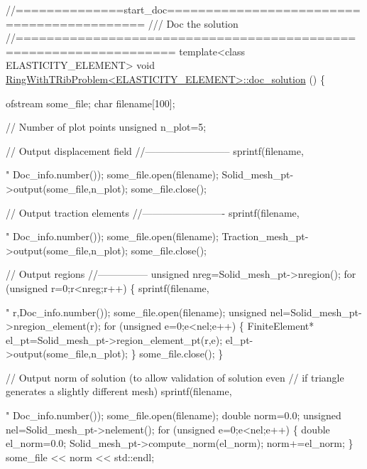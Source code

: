 \begin{DoxyCodeInclude}
\textcolor{comment}{//==============start\_doc===========================================}\textcolor{comment}{}
\textcolor{comment}{/// Doc the solution}
\textcolor{comment}{}\textcolor{comment}{//==================================================================}
\textcolor{keyword}{template}<\textcolor{keyword}{class} ELASTICITY\_ELEMENT>
\textcolor{keywordtype}{void} \hyperlink{classRingWithTRibProblem_a43b70b125f467aa5bb9c74d08f193aa5}{RingWithTRibProblem<ELASTICITY\_ELEMENT>::doc\_solution}
      ()
\{

 ofstream some\_file;
 \textcolor{keywordtype}{char} filename[100];

 \textcolor{comment}{// Number of plot points}
 \textcolor{keywordtype}{unsigned} n\_plot=5; 

 \textcolor{comment}{// Output displacement field}
 \textcolor{comment}{//--------------------------}
 sprintf(filename,\textcolor{stringliteral}{"%
         Doc\_info.number());
 some\_file.open(filename);
 Solid\_mesh\_pt->output(some\_file,n\_plot);
 some\_file.close();

 \textcolor{comment}{// Output traction elements}
 \textcolor{comment}{//-------------------------}
 sprintf(filename,\textcolor{stringliteral}{"%
         Doc\_info.number());
 some\_file.open(filename);
 Traction\_mesh\_pt->output(some\_file,n\_plot);
 some\_file.close();

 \textcolor{comment}{// Output regions}
 \textcolor{comment}{//---------------}
 \textcolor{keywordtype}{unsigned} nreg=Solid\_mesh\_pt->nregion();
 \textcolor{keywordflow}{for} (\textcolor{keywordtype}{unsigned} r=0;r<nreg;r++)
  \{
   sprintf(filename,\textcolor{stringliteral}{"%
           r,Doc\_info.number());   
   some\_file.open(filename);   
   \textcolor{keywordtype}{unsigned} nel=Solid\_mesh\_pt->nregion\_element(r);
   \textcolor{keywordflow}{for} (\textcolor{keywordtype}{unsigned} e=0;e<nel;e++)
    \{     
     FiniteElement* el\_pt=Solid\_mesh\_pt->region\_element\_pt(r,e);
     el\_pt->output(some\_file,n\_plot);
    \}
   some\_file.close();
  \}

 \textcolor{comment}{// Output norm of solution (to allow validation of solution even}
 \textcolor{comment}{// if triangle generates a slightly different mesh)}
 sprintf(filename,\textcolor{stringliteral}{"%
         Doc\_info.number());   
 some\_file.open(filename);   
 \textcolor{keywordtype}{double} norm=0.0;
 \textcolor{keywordtype}{unsigned} nel=Solid\_mesh\_pt->nelement();
 \textcolor{keywordflow}{for} (\textcolor{keywordtype}{unsigned} e=0;e<nel;e++)
  \{
   \textcolor{keywordtype}{double} el\_norm=0.0;
   Solid\_mesh\_pt->compute\_norm(el\_norm);
   norm+=el\_norm;
  \}
 some\_file << norm << std::endl;

}}}}
\end{DoxyCodeInclude}
